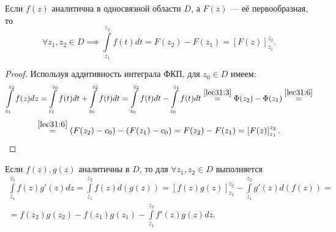 \documentclass[../../main.tex]{subfiles}
\begin{document}
\begin{rem}
	Если $f(z)$ аналитична в односвязной области $D$, а $F(z)$ --- её
	первообразная, то
	\begin{equation}
		\label{lec31:7}
		\forall z_1, z_2 \in D \implies \int\limits_{z_1}^{z_2} f(t) dt =
		F(z_2) - F(z_1) = \left[ F(z) \right]_{z_1}^{z_2}.
	\end{equation}
\end{rem}
\begin{proof}
	Используя аддитивность интеграла ФКП, для $z_0 \in D$ имеем:
	\[ \int\limits_{z_1}^{z_2} f(z) dz =
	\int\limits_{z_1}^{z_0} f(t) dt + \int\limits_{z_0}^{z_2} f(t) dt =
	\int\limits_{z_0}^{z_2} f(t) dt - \int\limits_{z_0}^{z_1} f(t) dt
	\stackrel{ \eqref{lec31:3} }{=} \Phi(z_2) - \Phi(z_1)
	\stackrel{ \eqref{lec31:6} }{=}
	\] \[
	\stackrel{ \eqref{lec31:6} }{=} (F(z_2) - c_0) - (F(z_1) - c_0) =
	F(z_2) - F(z_1) = \left[ F(z) \right]_{z_1}^{z_2}. \qedhere
	\]
\end{proof}
\begin{crl*}
	Если $f(z), g(z)$ аналитичны в $D$, то для $\forall z_1, z_2 \in D$ 
	выполняется
\begin{equation}
	\label{lec31:8}
	\begin{gathered}
	\int\limits_{z_1}^{z_2} f(z) g'(z) dz = 
	\int\limits_{z_1}^{z_2} f(z) d(g(z)) =
	[f(z)g(z)]_{z_1}^{z_2} - \int\limits_{z_1}^{z_2} g'(z) d(f(z)) = \\ =
	f(z_2)g(z_2) - f(z_1)g(z_1) - \int\limits_{z_1}^{z_2} f'(z) g(z) dz.
	\end{gathered}
\end{equation}
\end{crl*}
\end{document}
